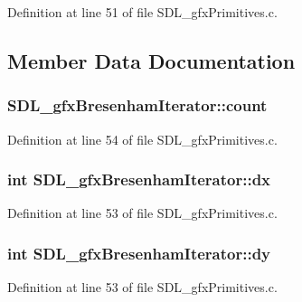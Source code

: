Definition at line 51 of file S\+D\+L\+\_\+gfx\+Primitives.\+c.



\subsection{Member Data Documentation}
\hypertarget{struct_s_d_l__gfx_bresenham_iterator_abe93f64aa99fc869120b7d388a092cb4}{}
\subsubsection[{count}]{ S\+D\+L\+\_\+gfx\+Bresenham\+Iterator\+::count}\label{struct_s_d_l__gfx_bresenham_iterator_abe93f64aa99fc869120b7d388a092cb4}


Definition at line 54 of file S\+D\+L\+\_\+gfx\+Primitives.\+c.

\hypertarget{struct_s_d_l__gfx_bresenham_iterator_ab6176f6610660d5f580cb43329417f1d}{}
\subsubsection[{dx}]{\setlength{\rightskip}{0pt plus 5cm}int S\+D\+L\+\_\+gfx\+Bresenham\+Iterator\+::dx}\label{struct_s_d_l__gfx_bresenham_iterator_ab6176f6610660d5f580cb43329417f1d}


Definition at line 53 of file S\+D\+L\+\_\+gfx\+Primitives.\+c.

\hypertarget{struct_s_d_l__gfx_bresenham_iterator_a8f3193107ce2f1e545ded809201fc4b4}{}
\subsubsection[{dy}]{\setlength{\rightskip}{0pt plus 5cm}int S\+D\+L\+\_\+gfx\+Bresenham\+Iterator\+::dy}\label{struct_s_d_l__gfx_bresenham_iterator_a8f3193107ce2f1e545ded809201fc4b4}


Definition at line 53 of file S\+D\+L\+\_\+gfx\+Primitives.\+c.


